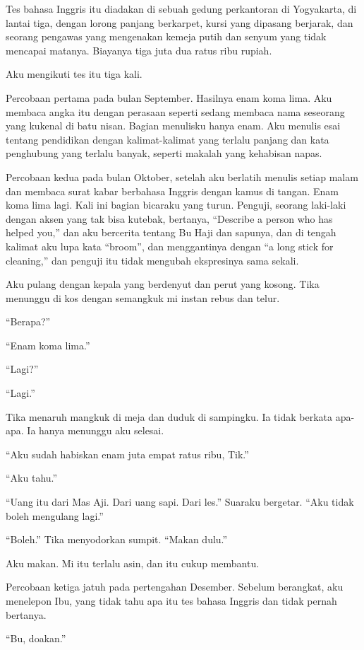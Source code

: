 \documentclass[11pt,twoside,openany]{book}
\begin{document}
Tes bahasa Inggris itu diadakan di sebuah gedung perkantoran di Yogyakarta, di lantai tiga, dengan lorong panjang berkarpet, kursi yang dipasang berjarak, dan seorang pengawas yang mengenakan kemeja putih dan senyum yang tidak mencapai matanya. Biayanya tiga juta dua ratus ribu rupiah.

Aku mengikuti tes itu tiga kali.

Percobaan pertama pada bulan September. Hasilnya enam koma lima. Aku membaca angka itu dengan perasaan seperti sedang membaca nama seseorang yang kukenal di batu nisan. Bagian menulisku hanya enam. Aku menulis esai tentang pendidikan dengan kalimat-kalimat yang terlalu panjang dan kata penghubung yang terlalu banyak, seperti makalah yang kehabisan napas.

Percobaan kedua pada bulan Oktober, setelah aku berlatih menulis setiap malam dan membaca surat kabar berbahasa Inggris dengan kamus di tangan. Enam koma lima lagi. Kali ini bagian bicaraku yang turun. Penguji, seorang laki-laki dengan aksen yang tak bisa kutebak, bertanya, ``Describe a person who has helped you,'' dan aku bercerita tentang Bu Haji dan sapunya, dan di tengah kalimat aku lupa kata ``broom'', dan menggantinya dengan ``a long stick for cleaning,'' dan penguji itu tidak mengubah ekspresinya sama sekali.

Aku pulang dengan kepala yang berdenyut dan perut yang kosong. Tika menunggu di kos dengan semangkuk mi instan rebus dan telur.

``Berapa?''

``Enam koma lima.''

``Lagi?''

``Lagi.''

Tika menaruh mangkuk di meja dan duduk di sampingku. Ia tidak berkata apa-apa. Ia hanya menunggu aku selesai.

``Aku sudah habiskan enam juta empat ratus ribu, Tik.''

``Aku tahu.''

``Uang itu dari Mas Aji. Dari uang sapi. Dari les.'' Suaraku bergetar. ``Aku tidak boleh mengulang lagi.''

``Boleh.'' Tika menyodorkan sumpit. ``Makan dulu.''

Aku makan. Mi itu terlalu asin, dan itu cukup membantu.

Percobaan ketiga jatuh pada pertengahan Desember. Sebelum berangkat, aku menelepon Ibu, yang tidak tahu apa itu tes bahasa Inggris dan tidak pernah bertanya.

``Bu, doakan.''
\end{document}
